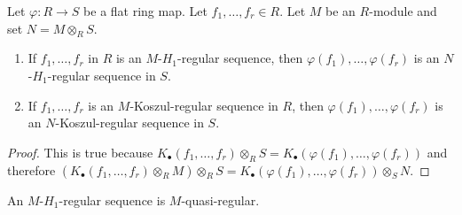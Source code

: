 \begin{lemma}
\label{lemma-koszul-regular-flat-base-change}
Let $\varphi : R \to S$ be a flat ring map. Let $f_1, \ldots, f_r \in R$.
Let $M$ be an $R$-module and set $N = M \otimes_R S$.
\begin{enumerate}
\item If $f_1, \ldots, f_r$ in $R$ is an $M$-$H_1$-regular sequence, then
$\varphi(f_1), \ldots, \varphi(f_r)$ is an $N$-$H_1$-regular
sequence in $S$.
\item If $f_1, \ldots, f_r$ is an $M$-Koszul-regular sequence in $R$, then
$\varphi(f_1), \ldots, \varphi(f_r)$ is an $N$-Koszul-regular
sequence in $S$.
\end{enumerate}
\end{lemma}

\begin{proof}
This is true because
$K_\bullet(f_1, \ldots, f_r) \otimes_R S =
K_\bullet(\varphi(f_1), \ldots, \varphi(f_r))$
and therefore
$(K_\bullet(f_1, \ldots, f_r) \otimes_R M) \otimes_R S =
K_\bullet(\varphi(f_1), \ldots, \varphi(f_r)) \otimes_S N$.
\end{proof}

\begin{lemma}
\label{lemma-H1-regular-quasi-regular}
An $M$-$H_1$-regular sequence is $M$-quasi-regular.
\end{lemma}

